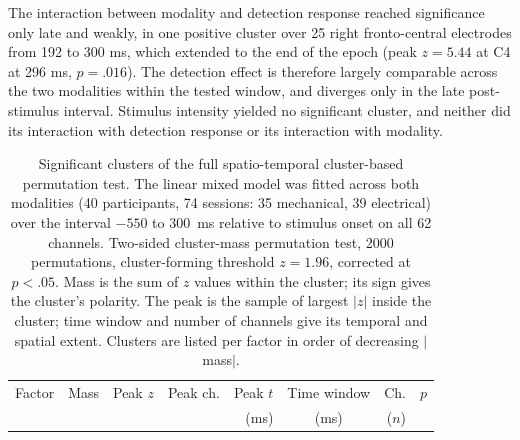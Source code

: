 \documentclass[11pt,a4paper,onecolumn]{article}
\begin{document}
The interaction between modality and detection response reached significance only late and weakly, in one positive cluster over 25 right fronto-central electrodes from 192 to 300 ms, which extended to the end of the epoch (peak $z = 5.44$ at C4 at 296 ms, $p = .016$). The detection effect is therefore largely comparable across the two modalities within the tested window, and diverges only in the late post-stimulus interval.
Stimulus intensity yielded no significant cluster, and neither did its interaction with detection response or its interaction with modality.

\begin{table}[H]
  \centering
  \small
  \setlength{\tabcolsep}{4pt}
  \caption{Significant clusters of the full spatio-temporal cluster-based permutation test. The linear mixed model was fitted across both modalities (40 participants, 74 sessions: 35 mechanical, 39 electrical) over the interval $-550$ to $300$~ms relative to stimulus onset on all 62 channels. Two-sided cluster-mass permutation test, 2000 permutations, cluster-forming threshold $z = 1.96$, corrected at $p < .05$. Mass is the sum of $z$ values within the cluster; its sign gives the cluster's polarity. The peak is the sample of largest $|z|$ inside the cluster; time window and number of channels give its temporal and spatial extent. Clusters are listed per factor in order of decreasing $|$mass$|$.}
  \label{tab:clusters}
  \begin{tabular}{lrrcrcrc}
    \toprule
    Factor & Mass & Peak $z$ & Peak ch. & Peak $t$ & Time window & Ch. & $p$ \\
     &  &  &  & (ms) & (ms) & ($n$) &  \\
    \midrule
    

  \end{tabular}
\end{table}
\end{document}
